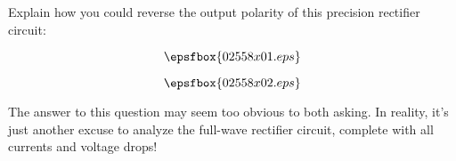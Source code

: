 

Explain how you could reverse the output polarity of this precision rectifier circuit:

$$\epsfbox{02558x01.eps}$$







$$\epsfbox{02558x02.eps}$$







The answer to this question may seem too obvious to both asking.  In reality, it's just another excuse to analyze the full-wave rectifier circuit, complete with all currents and voltage drops!




